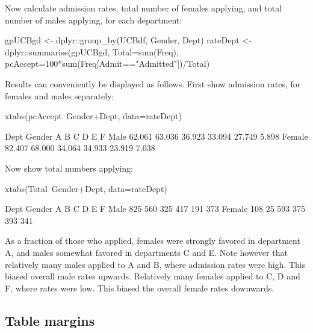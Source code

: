 \documentclass{tufte-book}\usepackage[]{graphicx}\usepackage[]{color}
\begin{document}
Now calculate admission rates, total number of females applying,
and total number of males applying, for each department:
\begin{Schunk}
\begin{Sinput}
gpUCBgd <- dplyr::group_by(UCBdf, Gender, Dept)
rateDept <- dplyr::summarise(gpUCBgd,
    Total=sum(Freq),
    pcAccept=100*sum(Freq[Admit=="Admitted"])/Total)
\end{Sinput}
\end{Schunk}

Results can conveniently be displayed as follows.  First show
admission rates, for females and males separately:
\begin{Schunk}
\begin{Sinput}
xtabs(pcAccept~Gender+Dept, data=rateDept)
\end{Sinput}
\begin{Soutput}
        Dept
Gender        A      B      C      D      E      F
  Male   62.061 63.036 36.923 33.094 27.749  5.898
  Female 82.407 68.000 34.064 34.933 23.919  7.038
\end{Soutput}
\end{Schunk}

Now show total numbers applying:
\begin{Schunk}
\begin{Sinput}
xtabs(Total~Gender+Dept, data=rateDept)
\end{Sinput}
\begin{Soutput}
        Dept
Gender     A   B   C   D   E   F
  Male   825 560 325 417 191 373
  Female 108  25 593 375 393 341
\end{Soutput}
\end{Schunk}

As a fraction of those who applied, females were strongly favored
in department A, and males somewhat favored in departments C and E.
Note however that relatively many males applied to A and B, where admission
  rates were high. This biased overall male rates upwards. Relatively
  many females applied to C, D and F, where rates were low.
  This biased the overall female rates downwards.

\subsection{Table margins}
\end{document}
